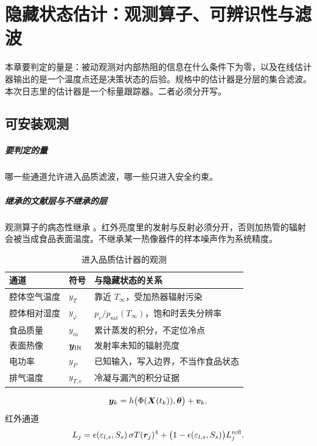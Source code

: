 \chapter{隐藏状态估计：观测算子、可辨识性与滤波}
\label{ch:est}

本章要判定的量是：被动观测对内部热阻的信息在什么条件下为零，以及在线估计器输出的是一个温度点还是决策状态的后验。规格中的估计器是分层的集合滤波。本次日志里的估计器是一个标量跟踪器。二者必须分开写。

\section{可安装观测}

\paragraph{要判定的量}
哪一些通道允许进入品质滤波，哪一些只进入安全约束。

\paragraph{继承的文献层与不继承的层}
观测算子的病态性继承 \cite{ozisik2000}。红外亮度里的发射与反射必须分开，否则加热管的辐射会被当成食品表面温度。不继承某一热像器件的样本噪声作为系统精度。

\begin{table}[ht]
\centering
\caption{进入品质估计器的观测}
\begin{tabularx}{\textwidth}{llX}
\toprule
通道 & 符号 & 与隐藏状态的关系 \\
\midrule
腔体空气温度 & \(y_T\) & 靠近 \(T_\infty\)，受加热器辐射污染 \\
腔体相对湿度 & \(y_\varphi\) & \(p_v/p_{\mathrm{sat}}(T_\infty)\)，饱和时丢失分辨率 \\
食品质量 & \(y_m\) & 累计蒸发的积分，不定位冷点 \\
表面热像 & \(\bm{y}_{\mathrm{IR}}\) & 发射率未知的辐射亮度 \\
电功率 & \(y_P\) & 已知输入，写入边界，不当作食品状态 \\
排气温度 & \(y_{T,e}\) & 冷凝与漏汽的积分证据 \\
\bottomrule
\end{tabularx}
\end{table}

\begin{definition}[观测方程]
\begin{equation}
\label{eq:obs}
\bm{y}_k=h\big(\Phi(\bm{X}(t_k)),\bm{\theta}\big)+\bm{v}_k.
\end{equation}
红外通道
\begin{equation}
\label{eq:ir}
L_j=\epsilon(\varepsilon_{l,s},S_s)\,\sigma T(\bm{r}_j)^4
+\big(1-\epsilon(\varepsilon_{l,s},S_s)\big)L_j^{\mathrm{refl}}.
\end{equation}
\end{definition}


